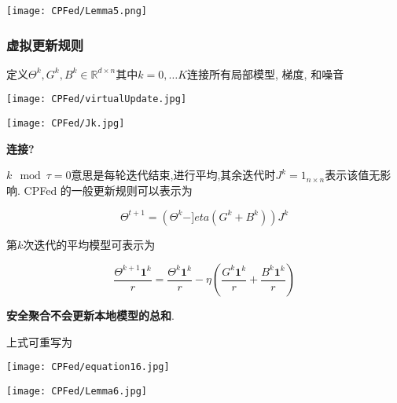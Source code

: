 \begin{figure*}[!ht]
    \setlength{\abovecaptionskip}{0.1cm}
    \centering    
    \texttt{[image: CPFed/Lemma5.png]}
    \label{Lemma5}
\end{figure*}
\newpage
\subsubsection{虚拟更新规则}

定义$\Theta^k, G^k,B^k \in \mathbb{R}^{d \times n} \text{其中} k =0, \dots  K$连接所有局部模型, 梯度, 和噪音
\begin{figure*}[!ht]
    \setlength{\abovecaptionskip}{0.1cm}
    \centering    
    \texttt{[image: CPFed/virtualUpdate.jpg]}
    \label{virtualUpdate}
\end{figure*} 

\begin{figure*}[!ht]
    \setlength{\abovecaptionskip}{0.1cm}
    \centering    
    \texttt{[image: CPFed/Jk.jpg]}
    \label{Jk}
\end{figure*}

\textbf{连接?}


$k \mod \tau =0$意思是每轮迭代结束,进行平均,其余迭代时$J^k= 1_{n \times n} $表示该值无影响.
CPFed 的一般更新规则可以表示为

$$ \Theta^{t+1} =( \Theta ^k - ]eta ( G^k+B^k)) J^k$$

第$k$次迭代的平均模型可表示为

$$ \frac{\Theta^{k+1} \mathbf{1}^k}{r} =\frac{\Theta^k \mathbf{1}^k}{r}- \eta (\frac{G^k \mathbf{1}^k}{r} +\frac{B^k\mathbf{1}^k}{r} )$$


\textbf{安全聚合不会更新本地模型的总和}.

上式可重写为
\begin{figure*}[!ht]
    \setlength{\abovecaptionskip}{0.1cm}
    \centering    
    \texttt{[image: CPFed/equation16.jpg]}
\end{figure*}

\begin{figure*}[!ht]
    \setlength{\abovecaptionskip}{0.1cm}
    \centering    
    \texttt{[image: CPFed/Lemma6.jpg]}
    \label{Lemma6}
\end{figure*}

